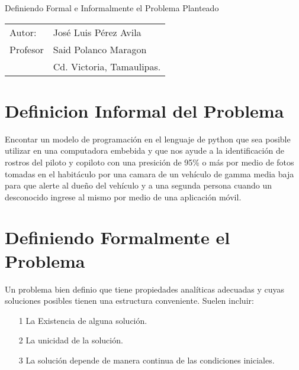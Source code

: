 \documentclass[11pt,letterpaper]{article}
\begin{document}
\newpage
\pagestyle{fancy}
\fancyhf{}
\vspace*{6cm}
\begin{center}
\Huge  {Definiendo Formal e Informalmente el Problema Planteado}
\vspace{1cm}
\end{center}
\begin{center}
\begin{tabular}{ll}
Autor: & José Luis Pérez Avila\\
Profesor & Said Polanco Maragon\\
& Cd. Victoria, Tamaulipas.
\end{tabular}
\end{center}

\section{Definicion Informal del Problema}
Encontar un modelo de programación en el lenguaje de python que sea posible utilizar en una computadora embebida y que nos ayude a la identificación de rostros del piloto y copiloto con una presición de 95\% o más por medio de fotos tomadas en el habitáculo por una camara de un vehículo de gamma media baja para que alerte al dueño del vehículo y a una segunda persona cuando un desconocido ingrese al mismo por medio de una aplicación móvil.

\section{Definiendo Formalmente el Problema}
Un problema bien definio que tiene propiedades analíticas adecuadas y cuyas soluciones posibles tienen una estructura conveniente. Suelen incluir:

\begin{itemize}
\item[1]{La Existencia de alguna solución.}
\item[2]{La unicidad de la solución.}
\item[3]{La solución depende de manera continua de las condiciones iniciales.}
\end{itemize}
\end{document}
